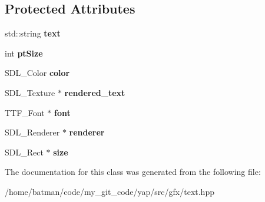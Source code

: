\subsection*{Protected Attributes}
\begin{DoxyCompactItemize}
\item 
\hypertarget{classText_aacef942c163c3fdc6258d1aff924d27c}{}std\+::string {\bfseries text}\label{classText_aacef942c163c3fdc6258d1aff924d27c}

\item 
\hypertarget{classText_ac67c9c21854422cb8820f126f749cf16}{}int {\bfseries pt\+Size}\label{classText_ac67c9c21854422cb8820f126f749cf16}

\item 
\hypertarget{classText_ab0f771bd18d8e968f7aaee4a4e26e385}{}S\+D\+L\+\_\+\+Color {\bfseries color}\label{classText_ab0f771bd18d8e968f7aaee4a4e26e385}

\item 
\hypertarget{classText_a5e4a53cb2f8777da607763ccc7c73f2b}{}S\+D\+L\+\_\+\+Texture $\ast$ {\bfseries rendered\+\_\+text}\label{classText_a5e4a53cb2f8777da607763ccc7c73f2b}

\item 
\hypertarget{classText_ae23ac53acb57e760b91c81d8c4aec8c7}{}T\+T\+F\+\_\+\+Font $\ast$ {\bfseries font}\label{classText_ae23ac53acb57e760b91c81d8c4aec8c7}

\item 
\hypertarget{classText_ad26c71bb23e87ed69b9e38210bdde932}{}S\+D\+L\+\_\+\+Renderer $\ast$ {\bfseries renderer}\label{classText_ad26c71bb23e87ed69b9e38210bdde932}

\item 
\hypertarget{classText_a64f890bd55dee40dff17be443d1aa779}{}S\+D\+L\+\_\+\+Rect $\ast$ {\bfseries size}\label{classText_a64f890bd55dee40dff17be443d1aa779}

\end{DoxyCompactItemize}


The documentation for this class was generated from the following file\+:\begin{DoxyCompactItemize}
\item 
/home/batman/code/my\+\_\+git\+\_\+code/yap/src/gfx/text.\+hpp\end{DoxyCompactItemize}
